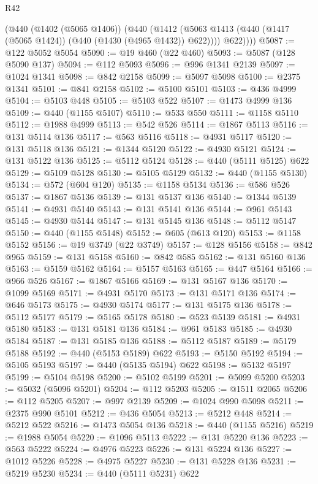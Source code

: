 \begin{lexlean}{R42}
\begin{coremodule}
        (@440
          (@1402 (@5065 @1406))
          (@440
            (@1412 (@5063 @1413 (@440 (@1417 (@5065 @1424)) (@440 (@1430 (@4965 @1432)) @622))))
            @622))))
@5087 := @122 @5052 @5054
@5090 := @19 @460 (@22 @460)
@5093 := @5087 (@128 @5090 @137)
@5094 := @112 @5093
@5096 := @996 @1341 @2139
@5097 := @1024 @1341
@5098 := @842 @2158
@5099 := @5097 @5098
@5100 := @2375 @1341
@5101 := @841 @2158
@5102 := @5100 @5101
@5103 := @436 @4999
@5104 := @5103 @448
@5105 := @5103 @522
@5107 := @1473 @4999 @136
@5109 := @440 (@1155 @5107)
@5110 := @533 @550
@5111 := @1158 @5110
@5112 := @1988 @4999
@5113 := @542 @526
@5114 := @1867 @5113
@5116 := @131 @5114 @136
@5117 := @563 @5116
@5118 := @4931 @5117
@5120 := @131 @5118 @136
@5121 := @1344 @5120
@5122 := @4930 @5121
@5124 := @131 @5122 @136
@5125 := @5112 @5124
@5128 := @440 (@5111 @5125) @622
@5129 := @5109 @5128
@5130 := @5105 @5129
@5132 := @440 (@1155 @5130)
@5134 := @572 (@604 @120)
@5135 := @1158 @5134
@5136 := @586 @526
@5137 := @1867 @5136
@5139 := @131 @5137 @136
@5140 := @1344 @5139
@5141 := @4931 @5140
@5143 := @131 @5141 @136
@5144 := @961 @5143
@5145 := @4930 @5144
@5147 := @131 @5145 @136
@5148 := @5112 @5147
@5150 := @440 (@1155 @5148)
@5152 := @605 (@613 @120)
@5153 := @1158 @5152
@5156 := @19 @3749 (@22 @3749)
@5157 := @128 @5156
@5158 := @842 @965
@5159 := @131 @5158
@5160 := @842 @585
@5162 := @131 @5160 @136
@5163 := @5159 @5162
@5164 := @5157 @5163
@5165 := @447 @5164
@5166 := @966 @526
@5167 := @1867 @5166
@5169 := @131 @5167 @136
@5170 := @1099 @5169
@5171 := @4931 @5170
@5173 := @131 @5171 @136
@5174 := @646 @5173
@5175 := @4930 @5174
@5177 := @131 @5175 @136
@5178 := @5112 @5177
@5179 := @5165 @5178
@5180 := @523 @5139
@5181 := @4931 @5180
@5183 := @131 @5181 @136
@5184 := @961 @5183
@5185 := @4930 @5184
@5187 := @131 @5185 @136
@5188 := @5112 @5187
@5189 := @5179 @5188
@5192 := @440 (@5153 @5189) @622
@5193 := @5150 @5192
@5194 := @5105 @5193
@5197 := @440 (@5135 @5194) @622
@5198 := @5132 @5197
@5199 := @5104 @5198
@5200 := @5102 @5199
@5201 := @5099 @5200
@5203 := @5032 (@5096 @5201)
@5204 := @112 @5203
@5205 := @1511 @2065
@5206 := @112 @5205
@5207 := @997 @2139
@5209 := @1024 @990 @5098
@5211 := @2375 @990 @5101
@5212 := @436 @5054
@5213 := @5212 @448
@5214 := @5212 @522
@5216 := @1473 @5054 @136
@5218 := @440 (@1155 @5216)
@5219 := @1988 @5054
@5220 := @1096 @5113
@5222 := @131 @5220 @136
@5223 := @563 @5222
@5224 := @4976 @5223
@5226 := @131 @5224 @136
@5227 := @1012 @5226
@5228 := @4975 @5227
@5230 := @131 @5228 @136
@5231 := @5219 @5230
@5234 := @440 (@5111 @5231) @622

\end{coremodule}
\end{lexlean}
